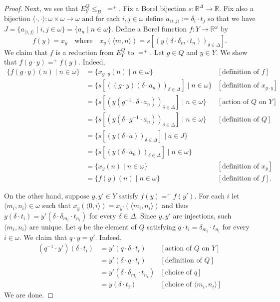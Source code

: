 \documentclass[12pt]{amsart}
\theoremstyle{plain}
\theoremstyle{definition}
\begin{document}
\begin{proof}
Next, we see that $E^Q_Y \le_B \; =^+$.
Fix a Borel bijection $s : \mathbb{R}^{\Delta} \rightarrow \mathbb{R}$.
Fix also a bijection $\langle \cdot, \cdot \rangle : \omega \times \omega \rightarrow \omega$ and for each $i, j \in \omega$ define $a_{\langle i, j\rangle} := \delta_i \cdot t_j$ so that we have $J = \{a_{\langle i, j\rangle} \mid i, j \in \omega\} = \{a_n \mid n \in \omega\}$.
Define a Borel function $f : Y \rightarrow \mathbb{R}^\omega$ by
\[ f(y) = x_y \quad \text{where} \quad x_y(\langle m, n \rangle) = s[(y(\delta \cdot \delta_m \cdot t_n))_{\delta \in \Delta}]. \]
We claim that $f$ is a reduction from $E^Q_Y$ to $=^+$.
Let $g \in Q$ and $y \in Y$.
We show that $f(g \cdot y) =^+ f(y)$.
Indeed,
\begin{align*}
\{f(g \cdot y)(n) \mid n \in \omega \} &= \{x_{g \cdot y}(n) \mid n \in \omega \} & [\text{definition of } f] \\
&= \{s[((g \cdot y)(\delta \cdot a_n))_{\delta \in \Delta}] \mid n \in \omega\} & [\text{definition of } x_{g \cdot y}]\\
&= \{s[(y(g^{-1} \cdot \delta \cdot a_n))_{\delta \in \Delta}] \mid n \in \omega\} & [\text{action of } Q \text{ on } Y]\\
&= \{s[(y(\delta \cdot g^{-1}\cdot a_n))_{\delta \in \Delta}] \mid n \in \omega\} & [\text{definition of } Q]\\
&= \{s[(y(\delta \cdot a))_{\delta \in \Delta}] \mid a \in J\} \\
&= \{s[(y(\delta \cdot a_n))_{\delta \in \Delta}] \mid n \in \omega\} \\
&= \{x_y(n) \mid n \in \omega\} & [\text{definition of } x_y] \\
&= \{f(y)(n) \mid n \in \omega\} & [\text{definition of } f].
\end{align*}

On the other hand, suppose $y, y' \in Y$ satisfy $f(y) =^+ f(y')$.
For each $i$ let $\langle m_i, n_i \rangle \in \omega$ such that $x_y(\langle 0, i \rangle) = x_{y'}(\langle m_i, n_i \rangle)$ and thus $y(\delta \cdot t_i) = y'(\delta \cdot \delta_{m_i} \cdot t_{n_i})$ for every $\delta \in \Delta$.
Since $y, y'$ are injections, such $\langle m_i, n_i\rangle$ are unique.
Let $q$ be the element of $Q$ satisfying $q \cdot t_i = \delta_{m_i} \cdot t_{n_i}$ for every $i \in \omega$.
We claim that $q \cdot y = y'$.
Indeed,
\begin{align*}
(q^{-1} \cdot y')(\delta \cdot t_i) &= y'(q \cdot \delta \cdot t_i) & [\text{action of } Q \text{ on } Y] \\
&= y'(\delta \cdot q \cdot t_i) & [\text{definition of } Q]\\
&= y'(\delta \cdot \delta_{m_i} \cdot t_{n_i}) & [\text{choice of } q] \\
&= y(\delta \cdot t_i) & [\text{choice of } \langle m_i, n_i \rangle]
\end{align*}
We are done.
\end{proof}
\end{document}
